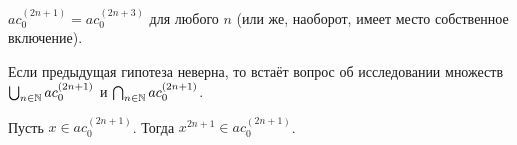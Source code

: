 \begin{hypothesis}
	$ac_0^{(2n+1)} = ac_0^{(2n+3)}$ для любого $n$ (или же, наоборот, имеет место собственное включение).
\end{hypothesis}

\begin{hypothesis}
	Если предыдущая гипотеза неверна, то встаёт вопрос об исследовании множеств
	$\bigcup_{n\in\mathbb{N}}ac_0^{(2n+1)}$ и 	$\bigcap_{n\in\mathbb{N}}ac_0^{(2n+1)}$.
\end{hypothesis}

\begin{hypothesis}
	Пусть $x\in ac_0^{(2n+1)}$.
	Тогда $x^{2n+1} \in ac_0^{(2n+1)}$.
\end{hypothesis}

